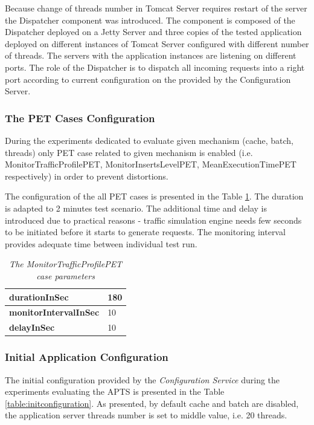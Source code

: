 \documentclass[12pt,a4paper]{article}
\begin{document}
Because change of threads number in Tomcat Server requires restart of the server the Dispatcher component was introduced. The component is composed of the Dispatcher deployed on a Jetty Server and three copies of the tested application deployed on different instances of Tomcat Server configured with different number of threads. The servers with the application instances are listening on different ports. The role of the Dispatcher is to dispatch all incoming requests into a right port according to current configuration on the provided by the Configuration Server.


\subsubsection{The PET Cases Configuration}

During the experiments dedicated to evaluate given mechanism (cache, batch, threads) only PET case related to given mechanism is enabled (i.e. MonitorTrafficProfilePET, MonitorInsertsLevelPET, MeanExecutionTimePET respectively) in order to prevent distortions. 

The configuration of the all PET cases is presented in the Table \ref{evaluationtestconf}. The duration is adapted to 2 minutes test scenario. The additional time and delay is introduced due to practical reasons - traffic simulation engine needs few seconds to be initiated before it starts to generate requests. The monitoring interval provides adequate time between individual test run.

\begin{table}[!htb]
\def\arraystretch{1.5}
\caption{\textit{The MonitorTrafficProfilePET case parameters}} \label{evaluationtestconf}
\begin{tabularx}{\textwidth}{X|X}

\textbf{durationInSec} & 180 \\ \hline
\textbf{monitorIntervalInSec} & 10 \\ \hline
\textbf{delayInSec} & 10\\
\end{tabularx}
\end{table}


\subsubsection{Initial Application Configuration}

The initial configuration provided by the \textit{Configuration Service} during the experiments evaluating the APTS is presented in the Table \ref{table:initconfiguration}. As presented, by default cache and batch are disabled, the application server threads number is set to middle value, i.e. 20 threads. 
\end{document}
